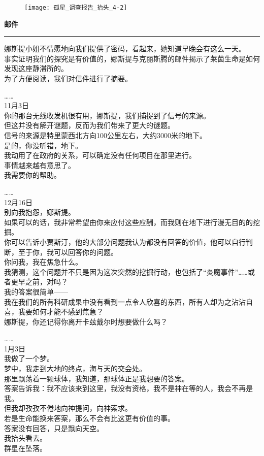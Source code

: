 \documentclass[openany]{book}
\begin{document}
\begin{figure}[h]
    \centering
    \texttt{[image: 孤星\_调查报告\_抬头\_4-2]}
\end{figure}
{\Large\textbf{邮件}}\par\noindent\rule{\textwidth}{0.4pt}
娜斯提小姐不情愿地向我们提供了密码，看起来，她知道早晚会有这么一天。\\
事实证明我们的探究是有价值的，娜斯提与克丽斯腾的邮件揭示了莱茵生命是如何发现这座静滞所的。\\
为了方便阅读，我们对信件进行了摘要。\\
\par
……\\
{
11月3日\\
你的那台无线收发机很有用，娜斯提，我们捕捉到了信号的来源。\\
但这并没有解开谜题，反而为我们带来了更大的谜题。\\
信号的来源是特里蒙西北方向100公里左右，大约3000米的地下。\\
是的，你没听错，地下。\\
我动用了在政府的关系，可以确定没有任何项目在那里进行。\\
事情越来越有意思了。\\
我需要你的帮助。}
\par
……\\
{
12月16日\\
别向我抱怨，娜斯提。\\
如果可以的话，我非常希望由你来应付这些应酬，而我则在地下进行漫无目的的挖掘。\\
你可以告诉小贾斯汀，他的大部分问题我认为都没有回答的价值，他可以自行判断，至于你，我可以回答你的问题。\\
你问我，我在焦急什么。\\
我猜测，这个问题并不只是因为这次突然的挖掘行动，也包括了“炎魔事件”……或者更早之前，对吗？\\
我的答案很简单——\\
我在我们的所有科研成果中没有看到一点令人欣喜的东西，所有人却为之沾沾自喜，我要如何才能不感到焦急？\\
娜斯提，你还记得你离开卡兹戴尔时想要做什么吗？}
\par
……\\
{
1月3日\\
我做了一个梦。\\
梦中，我走到大地的终点，海与天的交会处。\\
那里飘荡着一颗球体，我知道，那球体正是我想要的答案。\\
答案告诉我：我不应该来到这里，我没有资格，我不是神在等的人，我会不再是我。\\
但我却孜孜不倦地向神提问，向神索求。\\
若是生命能换来答案，那么不会有比这更有价值的事。\\
答案没有回答，只是飘向天空。\\
我抬头看去。\\
群星在坠落。}
\end{document}
